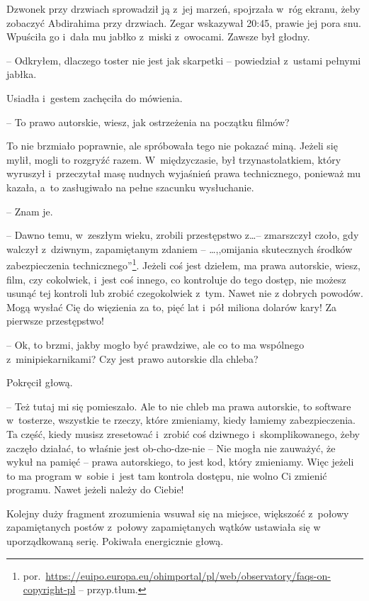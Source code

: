 \documentclass[oneside,polish,11pt,sfheadings]{mwbk}
\begin{document}
Dzwonek przy drzwiach sprowadził ją z~jej marzeń, spojrzała w~róg
ekranu, żeby zobaczyć Abdirahima przy drzwiach. Zegar wskazywał 20:45,
prawie jej pora snu. Wpuściła go i~dała mu jabłko z~miski z~owocami.
Zawsze był głodny.

-- Odkryłem, dlaczego toster nie jest jak skarpetki -- powiedział z~ustami
pełnymi jabłka.

Usiadła i~gestem zachęciła do mówienia.

-- To prawo autorskie, wiesz, jak ostrzeżenia na początku filmów?

To nie brzmiało poprawnie, ale spróbowała tego nie pokazać miną. Jeżeli
się mylił, mogli to rozgryźć razem. W~międzyczasie, był
trzynastolatkiem, który wyruszył i~przeczytał masę nudnych wyjaśnień
prawa technicznego, ponieważ mu kazała, a~to zasługiwało na pełne
szacunku wysłuchanie.

-- Znam je.

-- Dawno temu, w~zeszłym wieku, zrobili przestępstwo z\ldots  -- zmarszczył
czoło, gdy walczył z~dziwnym, zapamiętanym zdaniem -- \ldots  ,,omijania
skutecznych środków zabezpieczenia
technicznego''\footnote{por.~\url{https://euipo.europa.eu/ohimportal/pl/web/observatory/faqs-on-copyright-pl}
-- przyp.tłum.}. Jeżeli coś jest dziełem, ma prawa autorskie, wiesz,
film, czy cokolwiek, i~jest coś innego, co kontroluje do tego dostęp,
nie możesz usunąć tej kontroli lub zrobić czegokolwiek z~tym. Nawet nie
z dobrych powodów. Mogą wysłać Cię do więzienia za to, pięć lat i~pół
miliona dolarów kary! Za pierwsze przestępstwo!

-- Ok, to brzmi, jakby mogło być prawdziwe, ale co to ma wspólnego z~minipiekarnikami? Czy jest prawo autorskie dla chleba?

Pokręcił głową. 

-- Też tutaj mi się pomieszało. Ale to nie chleb ma prawa
autorskie, to software w~tosterze, wszystkie te rzeczy, które zmieniamy,
kiedy łamiemy zabezpieczenia. Ta część, kiedy musisz zresetować i~zrobić
coś dziwnego i~skomplikowanego, żeby zaczęło działać, to właśnie jest
ob-cho-dze-nie -- Nie mogła nie zauważyć, że wykuł na pamięć -- prawa
autorskiego, to jest kod, który zmieniamy. Więc jeżeli to ma program w~sobie i~jest tam kontrola dostępu, nie wolno Ci zmienić programu. Nawet
jeżeli należy do Ciebie!

Kolejny duży fragment zrozumienia wsuwał się na miejsce, większość z~połowy zapamiętanych postów z~połowy zapamiętanych wątków ustawiała się
w uporządkowaną serię. Pokiwała energicznie głową. 
\end{document}
